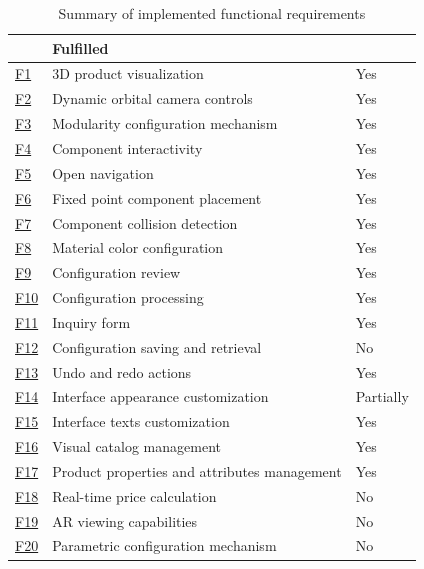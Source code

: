\begin{table}[htb]
\centering
\begin{tabular}{>{\raggedright\arraybackslash}p{0.5cm} >{\raggedright\arraybackslash}p{8cm} >{\centering\arraybackslash}p{2cm}}
\toprule
\multicolumn{2}{c}{\textbf{Requirement}} &
\textbf{Fulfilled}\\ 
\midrule
\hyperref[itm:F1]{F1} & 3D product visualization &
    Yes \\
\hyperref[itm:F2]{F2} & Dynamic orbital camera controls &
    Yes \\
\hyperref[itm:F3]{F3} & Modularity configuration mechanism &
    Yes \\
\hyperref[itm:F4]{F4} & Component interactivity &
    Yes \\
\hyperref[itm:F5]{F5} & Open navigation &
    Yes \\
\hyperref[itm:F6]{F6} & Fixed point component placement &
    Yes \\
\hyperref[itm:F7]{F7} & Component collision detection &
    Yes \\
\hyperref[itm:F8]{F8} & Material color configuration &
    Yes \\
\hyperref[itm:F9]{F9} & Configuration review &
    Yes \\
\hyperref[itm:F10]{F10} & Configuration processing &
    Yes \\
\hyperref[itm:F11]{F11} & Inquiry form &
    Yes \\
\hyperref[itm:F12]{F12} & Configuration saving and retrieval &
    No \\
\hyperref[itm:F13]{F13} & Undo and redo actions &
    Yes \\
\hyperref[itm:F14]{F14} & Interface appearance customization &
    Partially \\
\hyperref[itm:F15]{F15} & Interface texts customization &
    Yes \\
\hyperref[itm:F16]{F16} & Visual catalog management &
    Yes \\
\hyperref[itm:F17]{F17} & Product properties and attributes management &
    Yes \\
\hyperref[itm:F18]{F18} & Real-time price calculation &
    No \\
\hyperref[itm:F19]{F19} & AR viewing capabilities &
    No \\
\hyperref[itm:F20]{F20} & Parametric configuration mechanism &
    No \\
\bottomrule
\end{tabular}
\caption{Summary of implemented functional requirements}
\label{table:summary-implementation}
\end{table}


